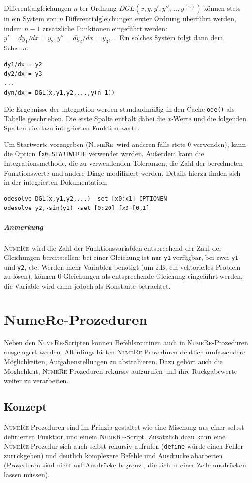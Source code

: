 \documentclass[DIV=14,headsepline,footsepline]{scrbook}
\newcommand{\NR}{\textsc{Nu\-me\-Re}}
\begin{document}
				Differentialgleichungen $n$-ter Ordnung $DGL(x,y,y',y'',\ldots,y^{(n)})$ können stets in ein System von $n$ Differentialgleichungen erster Ordnung überführt werden, indem $n-1$ zusätzliche Funktionen eingeführt werden: $y' = dy_1/dx = y_2, y'' = dy_2/dx = y_3, \ldots$ Ein solches System folgt dann dem Schema:
				\begin{lstlisting}
dy1/dx = y2
dy2/dx = y3
...
dyn/dx = DGL(x,y1,y2,...,y(n-1))
				\end{lstlisting}
	
				Die Ergebnisse der Integration werden standardmäßig in den Cache \lstinline+ode()+ als Tabelle geschrieben. Die erste Spalte enthält dabei die $x$-Werte und die folgenden Spalten die dazu integrierten Funktionswerte.
				
				Um Startwerte vorzugeben (\NR\ wird anderen falls stets 0 verwenden), kann die Option \lstinline+fx0=STARTWERTE+ verwendet werden. Außerdem kann die Integrationsmethode, die zu verwendenden Toleranzen, die Zahl der berechneten Funktionswerte und andere Dinge modifiziert werden. Details hierzu finden sich in der integrierten Dokumentation.
				\begin{lstlisting}
odesolve DGL(x,y1,y2,...) -set [x0:x1] OPTIONEN
odesolve y2,-sin(y1) -set [0:20] fx0=[0,1]
				\end{lstlisting}
				\paragraph{Anmerkung}\NR\ wird die Zahl der Funktionsvariablen entsprechend der Zahl der Gleichungen bereitstellen: bei einer Gleichung ist nur \lstinline+y1+ verfügbar, bei zwei \lstinline+y1+ und \lstinline+y2+, etc. Werden mehr Variablen benötigt (um z.B. ein vektorielles Problem zu lösen), können 0-Gleichungen als entsprechende Gleichung eingeführt werden, die Variable wird dann jedoch als Konstante betrachtet.
				
		\chapter{NumeRe-Prozeduren}
			Neben den \NR-Scripten können Befehlsroutinen auch in \NR-Prozeduren ausgelagert werden. Allerdings bieten \NR-Prozeduren deutlich umfassendere Möglichkeiten, Aufgabenstellungen zu abstrahieren. Dazu gehört auch die Möglichkeit, \NR-Prozeduren rekursiv aufzurufen und ihre Rückgabewerte weiter zu verarbeiten.
			\section{Konzept}
				\NR-Prozeduren sind im Prinzip gestaltet wie eine Mischung aus einer selbst definierten Funktion und einem \NR-Script. Zusätzlich dazu kann eine \NR-Prozedur sich auch selbst rekursiv aufrufen (\lstinline+define+ würde einen Fehler zurückgeben) und deutlich komplexere Befehle und Ausdrücke abarbeiten (Prozeduren sind nicht auf Ausdrücke begrenzt, die sich in einer Zeile ausdrücken lassen müssen).
				
\end{document}
